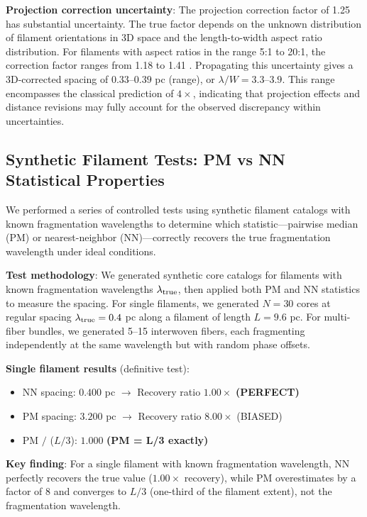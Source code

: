 \documentclass[twoside,twocolumn]{mnras}
\begin{document}
\textbf{Projection correction uncertainty}: The projection correction factor of 1.25 has substantial uncertainty. The true factor depends on the unknown distribution of filament orientations in 3D space and the length-to-width aspect ratio distribution. For filaments with aspect ratios in the range 5:1 to 20:1, the correction factor ranges from 1.18 to 1.41 \citep{Hacar2013}. Propagating this uncertainty gives a 3D-corrected spacing of $0.33$--$0.39$ pc (range), or $\lambda/W = 3.3$--$3.9$. This range encompasses the classical prediction of $4\times$, indicating that projection effects and distance revisions may fully account for the observed discrepancy within uncertainties.

\subsection{Synthetic Filament Tests: PM vs NN Statistical Properties}
\label{sec:synthetic_tests}

We performed a series of controlled tests using synthetic filament catalogs with known fragmentation wavelengths to determine which statistic—pairwise median (PM) or nearest-neighbor (NN)—correctly recovers the true fragmentation wavelength under ideal conditions.

\textbf{Test methodology}: We generated synthetic core catalogs for filaments with known fragmentation wavelengths $\lambda_{\rm true}$, then applied both PM and NN statistics to measure the spacing. For single filaments, we generated $N = 30$ cores at regular spacing $\lambda_{\rm true} = 0.4$ pc along a filament of length $L = 9.6$ pc. For multi-fiber bundles, we generated 5--15 interwoven fibers, each fragmenting independently at the same wavelength but with random phase offsets.

\textbf{Single filament results} (definitive test):
\begin{itemize}
    \item NN spacing: $0.400$ pc $\to$ Recovery ratio $1.00\times$ \textbf{(PERFECT)}
    \item PM spacing: $3.200$ pc $\to$ Recovery ratio $8.00\times$ (BIASED)
    \item PM $/$ ($L/3$): $1.000$ \textbf{(PM = L/3 exactly)}
\end{itemize}

\textbf{Key finding}: For a single filament with known fragmentation wavelength, NN perfectly recovers the true value ($1.00\times$ recovery), while PM overestimates by a factor of 8 and converges to $L/3$ (one-third of the filament extent), not the fragmentation wavelength.
\end{document}
